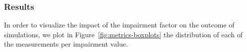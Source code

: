 \subsubsection{Results}
In order to visualize the impact of the impairment factor on the outcome of simulations, we plot in Figure~\ref{fig:metrics-boxplots} the distribution of each of the measurements per impairment value.
%




